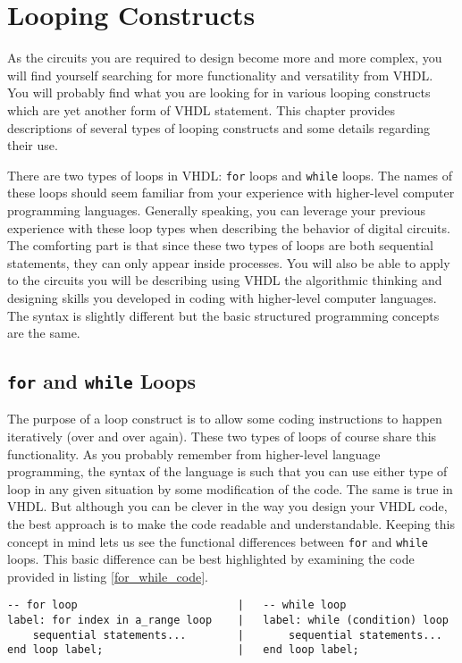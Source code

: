 %
%
%
\chapter{Looping Constructs}
As the circuits you are required to design become more and more complex, you will find yourself searching for more functionality and versatility from VHDL. You will probably find what you are looking for in various looping constructs which are yet another form of VHDL statement. This chapter provides descriptions of several types of looping constructs and some details regarding their use. 

There are two types of loops in VHDL: \texttt{for} loops and \texttt{while} loops. The names of these loops should seem familiar from your experience with higher-level computer programming languages. Generally speaking, you can leverage your previous experience with these loop types when describing the behavior of digital circuits. The comforting part is that since these two types of loops are both sequential statements, they can only appear inside processes. You will also be able to apply to the circuits you will be describing using VHDL the algorithmic thinking and designing skills you developed in coding with higher-level computer languages. The syntax is slightly different but the basic structured programming concepts are the same. 

\section{\texttt{for} and \texttt{while} Loops}
The purpose of a loop construct is to allow some coding instructions to happen iteratively (over and over again). These two types of loops of course share this functionality. As you probably remember from higher-level language programming, the syntax of the language is such that you can use either type of loop in any given situation by some modification of the code. The same is true in VHDL. But although you can be clever in the way you design your VHDL code, the best approach is to make the code readable and understandable. Keeping this concept in mind lets us see the functional differences between \texttt{for} and \texttt{while} loops. This basic difference can be best highlighted by examining the code provided in listing \ref{for_while_code}.

\noindent
\begin{minipage}{1\linewidth}
\begin{lstlisting}[label=for_while_code, caption=The basic structure of the \texttt{for} and \texttt{while} loops.]
-- for loop							|	-- while loop
label: for index in a_range loop	|	label: while (condition) loop
	sequential statements...		|		sequential statements...
end loop label;						|	end loop label;
\end{lstlisting}
\end{minipage}

